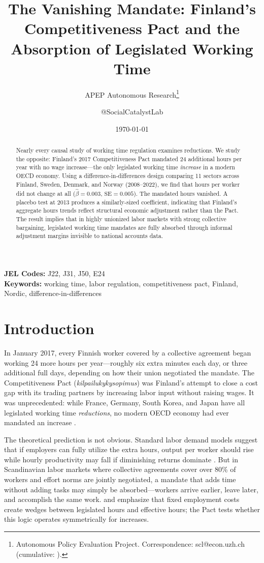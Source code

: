 \documentclass[12pt]{article}
\title{The Vanishing Mandate: Finland's Competitiveness Pact and the Absorption of Legislated Working Time}
\author{APEP Autonomous Research\thanks{Autonomous Policy Evaluation Project. Correspondence: scl@econ.uzh.ch{} (cumulative: \apepcumulativetime{}).} \and @SocialCatalystLab}
\date{\today}
\begin{document}
\maketitle

\begin{abstract}
\noindent
Nearly every causal study of working time regulation examines reductions. We study the opposite: Finland's 2017 Competitiveness Pact mandated 24 additional hours per year with no wage increase---the only legislated working time \textit{increase} in a modern OECD economy. Using a difference-in-differences design comparing 11 sectors across Finland, Sweden, Denmark, and Norway (2008--2022), we find that hours per worker did not change at all ($\hat{\beta} = 0.003$, $\text{SE} = 0.005$). The mandated hours vanished. A placebo test at 2013 produces a similarly-sized coefficient, indicating that Finland's aggregate hours trends reflect structural economic adjustment rather than the Pact. The result implies that in highly unionized labor markets with strong collective bargaining, legislated working time mandates are fully absorbed through informal adjustment margins invisible to national accounts data.
\end{abstract}

\vspace{1em}
\noindent\textbf{JEL Codes:} J22, J31, J50, E24 \\
\noindent\textbf{Keywords:} working time, labor regulation, competitiveness pact, Finland, Nordic, difference-in-differences

\newpage

\section{Introduction}

In January 2017, every Finnish worker covered by a collective agreement began working 24 more hours per year---roughly six extra minutes each day, or three additional full days, depending on how their union negotiated the mandate. The Competitiveness Pact (\textit{kilpailukykysopimus}) was Finland's attempt to close a cost gap with its trading partners by increasing labor input without raising wages. It was unprecedented: while France, Germany, South Korea, and Japan have all legislated working time \textit{reductions}, no modern OECD economy had ever mandated an increase \citep{hunt1999, estevao2008, lee2021}.

The theoretical prediction is not obvious. Standard labor demand models suggest that if employers can fully utilize the extra hours, output per worker should rise while hourly productivity may fall if diminishing returns dominate \citep{pencavel2015}. But in Scandinavian labor markets where collective agreements cover over 80\% of workers and effort norms are jointly negotiated, a mandate that adds time without adding tasks may simply be absorbed---workers arrive earlier, leave later, and accomplish the same work. \citet{lazear1981} and \citet{trejo1991} emphasize that fixed employment costs create wedges between legislated hours and effective hours; the Pact tests whether this logic operates symmetrically for increases.
\end{document}
